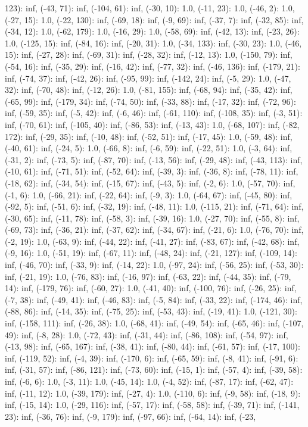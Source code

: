 \documentclass[parskip=half]{scrartcl}
\begin{document}
123): inf, (-43, 71): inf, (-104, 61): inf, (-30, 10): 1.0, (-11, 23): 1.0, (-46, 2): 1.0, (-27, 15): 1.0, (-22, 130): inf, (-69, 18): inf, (-9, 69): inf, (-37, 7): inf, (-32, 85): inf, (-34, 12): 1.0, (-62, 179): 1.0, (-16, 29): 1.0, (-58, 69): inf, (-42, 13): inf, (-23, 26): 1.0, (-125, 15): inf, (-84, 16): inf, (-20, 31): 1.0, (-34, 133): inf, (-30, 23): 1.0, (-46, 15): inf, (-27, 28): inf, (-69, 31): inf, (-28, 32): inf, (-12, 13): 1.0, (-150, 79): inf, (-54, 16): inf, (-35, 29): inf, (-16, 42): inf, (-77, 32): inf, (-46, 136): inf, (-179, 21): inf, (-74, 37): inf, (-42, 26): inf, (-95, 99): inf, (-142, 24): inf, (-5, 29): 1.0, (-47, 32): inf, (-70, 48): inf, (-12, 26): 1.0, (-81, 155): inf, (-68, 94): inf, (-35, 42): inf, (-65, 99): inf, (-179, 34): inf, (-74, 50): inf, (-33, 88): inf, (-17, 32): inf, (-72, 96): inf, (-59, 35): inf, (-5, 42): inf, (-6, 46): inf, (-61, 110): inf, (-108, 35): inf, (-3, 51): inf, (-70, 61): inf, (-105, 40): inf, (-86, 53): inf, (-13, 43): 1.0, (-68, 107): inf, (-82, 172): inf, (-29, 35): inf, (-10, 48): inf, (-52, 51): inf, (-17, 45): 1.0, (-59, 48): inf, (-40, 61): inf, (-24, 5): 1.0, (-66, 8): inf, (-6, 59): inf, (-22, 51): 1.0, (-3, 64): inf, (-31, 2): inf, (-73, 5): inf, (-87, 70): inf, (-13, 56): inf, (-29, 48): inf, (-43, 113): inf, (-10, 61): inf, (-71, 51): inf, (-52, 64): inf, (-39, 3): inf, (-36, 8): inf, (-78, 11): inf, (-18, 62): inf, (-34, 54): inf, (-15, 67): inf, (-43, 5): inf, (-2, 6): 1.0, (-57, 70): inf, (-1, 6): 1.0, (-66, 21): inf, (-22, 64): inf, (-9, 3): 1.0, (-64, 67): inf, (-45, 80): inf, (-92, 5): inf, (-51, 6): inf, (-32, 19): inf, (-48, 11): 1.0, (-115, 21): inf, (-71, 64): inf, (-30, 65): inf, (-11, 78): inf, (-58, 3): inf, (-39, 16): 1.0, (-27, 70): inf, (-55, 8): inf, (-69, 73): inf, (-36, 21): inf, (-37, 62): inf, (-34, 67): inf, (-21, 6): 1.0, (-76, 70): inf, (-2, 19): 1.0, (-63, 9): inf, (-44, 22): inf, (-41, 27): inf, (-83, 67): inf, (-42, 68): inf, (-9, 16): 1.0, (-51, 19): inf, (-67, 11): inf, (-48, 24): inf, (-21, 127): inf, (-109, 14): inf, (-46, 70): inf, (-33, 9): inf, (-14, 22): 1.0, (-97, 24): inf, (-56, 25): inf, (-53, 30): inf, (-21, 19): 1.0, (-76, 83): inf, (-16, 97): inf, (-63, 22): inf, (-44, 35): inf, (-79, 14): inf, (-179, 76): inf, (-60, 27): 1.0, (-41, 40): inf, (-100, 76): inf, (-26, 25): inf, (-7, 38): inf, (-49, 41): inf, (-46, 83): inf, (-5, 84): inf, (-33, 22): inf, (-174, 46): inf, (-88, 86): inf, (-14, 35): inf, (-75, 25): inf, (-53, 43): inf, (-19, 41): 1.0, (-121, 30): inf, (-158, 111): inf, (-26, 38): 1.0, (-68, 41): inf, (-49, 54): inf, (-65, 46): inf, (-107, 49): inf, (-8, 28): 1.0, (-72, 43): inf, (-31, 44): inf, (-86, 108): inf, (-54, 97): inf, (-13, 98): inf, (-65, 167): inf, (-38, 41): inf, (-80, 44): inf, (-61, 57): inf, (-17, 100): inf, (-119, 52): inf, (-4, 39): inf, (-170, 6): inf, (-65, 59): inf, (-8, 41): inf, (-91, 6): inf, (-31, 57): inf, (-86, 121): inf, (-73, 60): inf, (-15, 1): inf, (-57, 4): inf, (-39, 58): inf, (-6, 6): 1.0, (-3, 11): 1.0, (-45, 14): 1.0, (-4, 52): inf, (-87, 17): inf, (-62, 47): inf, (-11, 12): 1.0, (-39, 179): inf, (-27, 4): 1.0, (-110, 6): inf, (-9, 58): inf, (-18, 9): inf, (-15, 14): 1.0, (-29, 116): inf, (-57, 17): inf, (-58, 58): inf, (-39, 71): inf, (-141, 23): inf, (-36, 76): inf, (-9, 179): inf, (-97, 66): inf, (-64, 14): inf, (-23, 
\end{document}
